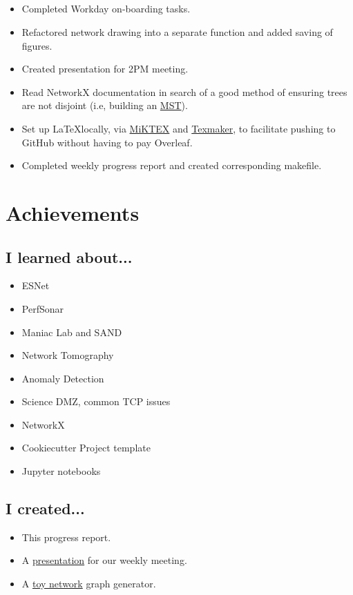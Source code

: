 \documentclass{weeklyreport}
\begin{document}
\subsection*{}

\begin{itemize}
    \item Completed Workday on-boarding tasks.
    \item Refactored network drawing into a separate function and added saving of figures.
    \item Created presentation for 2PM meeting.
    \item Read NetworkX documentation in search of a good method of ensuring trees are not disjoint (i.e, building an \href{https://networkx.github.io/documentation/stable/reference/algorithms/generated/networkx.algorithms.tree.mst.minimum_spanning_edges.html#networkx.algorithms.tree.mst.minimum_spanning_edges}{MST}).
    \item Set up \LaTeX locally, via \href{https://miktex.org/}{MiKTEX} and \href{https://www.xm1math.net/texmaker/}{Texmaker}, to facilitate pushing to GitHub without having to pay Overleaf.
    \item Completed weekly progress report and created corresponding makefile.
\end{itemize}

\section*{Achievements}
\subsection*{I learned about...}
\begin{itemize}
    \item ESNet
    \item PerfSonar
    \item Maniac Lab and SAND
    \item Network Tomography
    \item Anomaly Detection
    \item Science DMZ, common TCP issues
    \item NetworkX
    \item Cookiecutter Project template
    \item Jupyter notebooks
\end{itemize}

\pagebreak
\subsection*{I created...}
\begin{itemize}
	\item This progress report.
	\item A \href{https://docs.google.com/presentation/d/1Cm9z3TZmrk-BOiEYo0oock2HY4FlKp5m1iTx28EQzAQ/edit?usp=sharing}{presentation} for our weekly meeting.
    \item A \href{https://github.com/maniaclab/EdrisQarghah/tree/master/toy_network}{toy network} graph generator.
\end{itemize}
\end{document}
